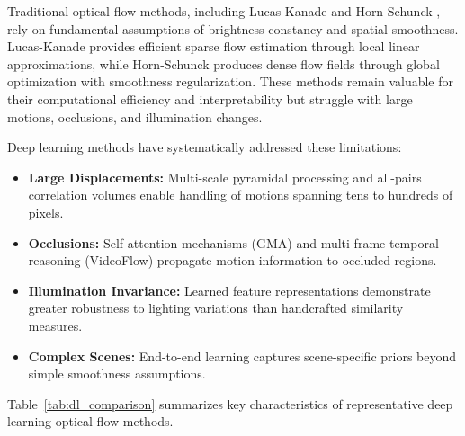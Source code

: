 Traditional optical flow methods, including Lucas-Kanade \cite{lucas1981iterative} and Horn-Schunck \cite{horn1981determining}, rely on fundamental assumptions of brightness constancy and spatial smoothness. Lucas-Kanade provides efficient sparse flow estimation through local linear approximations, while Horn-Schunck produces dense flow fields through global optimization with smoothness regularization. These methods remain valuable for their computational efficiency and interpretability but struggle with large motions, occlusions, and illumination changes.

Deep learning methods have systematically addressed these limitations:

\begin{itemize}
    \item \textbf{Large Displacements:} Multi-scale pyramidal processing and all-pairs correlation volumes enable handling of motions spanning tens to hundreds of pixels.
    \item \textbf{Occlusions:} Self-attention mechanisms (GMA) and multi-frame temporal reasoning (VideoFlow) propagate motion information to occluded regions.
    \item \textbf{Illumination Invariance:} Learned feature representations demonstrate greater robustness to lighting variations than handcrafted similarity measures.
    \item \textbf{Complex Scenes:} End-to-end learning captures scene-specific priors beyond simple smoothness assumptions.
\end{itemize}

Table~\ref{tab:dl_comparison} summarizes key characteristics of representative deep learning optical flow methods.

